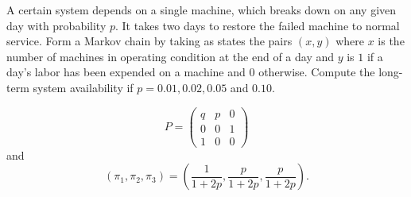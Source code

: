 \documentclass[12pt]{article}
\begin{document}
\begin{exercise}
    A certain system depends on a single machine, which breaks down on
    any given day with probability \( p \).  It takes two days to
    restore the failed machine to normal service.  Form a Markov chain
    by taking as states the pairs \( (x,y) \) where \( x \) is the
    number of machines in operating condition at the end of a day and \(
    y \) is \( 1 \) if a day's labor has been expended on a machine and \(
    0 \) otherwise.  Compute the long-term system availability if \( p =
    0.01, 0.02, 0.05 \) and \( 0.10 \).
\end{exercise}
\begin{solution}
    \[
        P =
        \begin{pmatrix}
            q & p & 0 \\
            0 & 0 & 1 \\
            1 & 0 & 0
        \end{pmatrix}
    \] and
    \[
        (\pi_1, \pi_2,\pi_3) = \left( \frac{1}{1+2p}, \frac{p}{1+2p},
        \frac{p}{1 + 2p} \right).
    \]
\end{solution}
\end{document}
